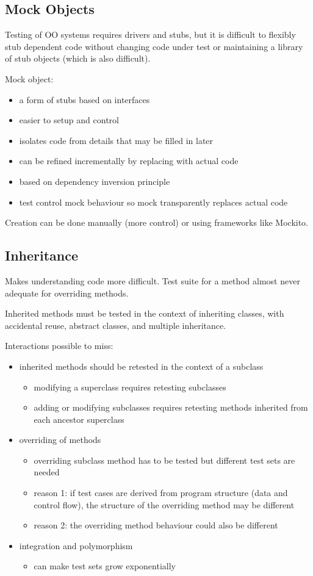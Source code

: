 \documentclass[11pt]{article}
\begin{document}
\subsection{Mock Objects}
\label{sec:org0692851}
Testing of OO systems requires drivers and stubs, but it is difficult to
flexibly stub dependent code without changing code under test or
maintaining a library of stub objects (which is also difficult).

Mock object:
\begin{itemize}
\item a form of stubs based on interfaces
\item easier to setup and control
\item isolates code from details that may be filled in later
\item can be refined incrementally by replacing with actual code
\item based on dependency inversion principle
\item test control mock behaviour so mock transparently replaces actual code
\end{itemize}

Creation can be done manually (more control) or using frameworks like Mockito.
\subsection{Inheritance}
\label{sec:orgc53ed34}
Makes understanding code more difficult. Test suite for a method almost never
adequate for overriding methods.

Inherited methods must be tested in the context of inheriting classes,
with accidental reuse, abstract classes, and multiple inheritance.

Interactions possible to miss:
\begin{itemize}
\item inherited methods should be retested in the context of a subclass
\begin{itemize}
\item modifying a superclass requires retesting subclasses
\item adding or modifying subclasses requires retesting methods inherited
from each ancestor superclass
\end{itemize}
\item overriding of methods
\begin{itemize}
\item overriding subclass method has to be tested but different test
sets are needed
\item reason 1: if test cases are derived from program structure
(data and control flow), the structure of the overriding method
may be different
\item reason 2: the overriding method behaviour could also be different
\end{itemize}
\item integration and polymorphism
\begin{itemize}
\item can make test sets grow exponentially
\end{itemize}
\end{itemize}
\end{document}
